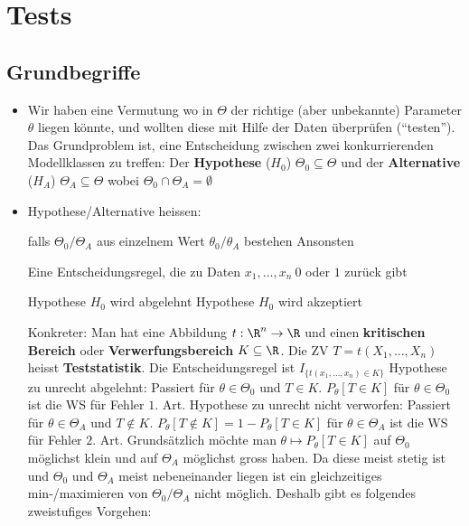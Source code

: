 
\section{Tests}
\subsection{Grundbegriffe}
\begin{itemize}
    \item Wir haben eine Vermutung wo in $\Theta$ der richtige (aber unbekannte) Parameter $\theta$ liegen könnte, und wollten diese mit Hilfe der Daten überprüfen (``testen''). Das Grundproblem ist, eine Entscheidung zwischen zwei konkurrierenden Modellklassen zu treffen: Der \textbf{Hypothese} ($H_0$) $\Theta_0 \subseteq \Theta$ und der \textbf{Alternative} ($H_A$) $\Theta_A \subseteq \Theta$ wobei $\Theta_0 \cap \Theta_A = \emptyset$
    \item Hypothese/Alternative heissen:
        \begin{itemize}
             falls $\Theta_0/\Theta_A$ aus einzelnem Wert $\theta_0/\theta_A$ bestehen
             Ansonsten
        \end{itemize}
     Eine Entscheidungsregel, die zu Daten $x_1, \dots, x_n \ 0$ oder $1$ zurück gibt
        \begin{itemize}
             Hypothese $H_0$ wird abgelehnt
             Hypothese $H_0$ wird akzeptiert
        \end{itemize}
        Konkreter: Man hat eine Abbildung $t: \R^n \to \R$ und einen \textbf{kritischen Bereich} oder \textbf{Verwerfungsbereich} $K \subseteq \R$. Die ZV $T = t(X_1, \dots, X_n)$ heisst \textbf{Teststatistik}. Die Entscheidungsregel ist $I_{\{t(x_1, \dots, x_n) \in K\}}$
         Hypothese zu unrecht abgelehnt: Passiert für $\theta \in \Theta_0$ und $T \in K$. $P_\theta[T \in K]$ für $\theta \in \Theta_0$ ist die WS für Fehler $1.$ Art.
         Hypothese zu unrecht nicht verworfen: Passiert für $\theta \in \Theta_A$ und $T \notin K$. $P_\theta[T \notin K] = 1 - P_\theta[T \in K]$ für $\theta \in \Theta_A$ ist die WS für Fehler $2.$ Art.
     Grundsätzlich möchte man $\theta \mapsto P_\theta[T \in K]$ auf $\Theta_0$ möglichst klein und auf $\Theta_A$ möglichst gross haben. Da diese meist stetig ist und $\Theta_0$ und $\Theta_A$ meist nebeneinander liegen ist ein gleichzeitiges min-/maximieren von $\Theta_0/\Theta_A$ nicht möglich. Deshalb gibt es folgendes zweistufiges Vorgehen:

\end{itemize}

